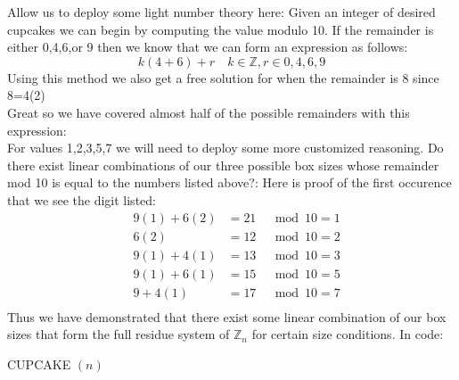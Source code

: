 \documentclass[11pt]{article}
\theoremstyle{definition}  %
\newcommand{\Z}{\mathbb{Z}}
\begin{document}
Allow us to deploy some light number theory here: Given an integer of desired cupcakes we can begin by computing the value modulo 10. If the remainder is either 0,4,6,or 9 then we know that we can form an expression as follows:
\[
  k(4+6)+r\quad k \in \Z , r\in {0,4,6,9}
\]
Using this method we also get a free solution for when the remainder is 8 since 8=4(2)\\
Great so we have covered almost half of the possible remainders with this expression: \\
For values 1,2,3,5,7 we will need to deploy some more customized reasoning. Do there exist linear combinations of our three possible box sizes whose remainder mod 10 is equal to the numbers listed above?: Here is proof of the first occurence that we see the digit listed:
\begin{align*}
  &9(1)+6(2)&=21 &\mod 10=1 \\
  &6(2)&=12 &\mod 10=2 \\
  &9(1)+4(1)&=13 &\mod 10=3 \\
  &9(1)+6(1)&=15 &\mod 10=5 \\
  &9+4(1)&=17&\mod 10=7 \\
\end{align*}
Thus we have demonstrated that there exist some linear combination of our box sizes that form the full residue system of $\Z_n$ for certain size conditions.
In code:
\begin{algorithm}
    \caption{CUPCAKE $(n)$ }
    \label{alg:algorithm_sum}
    \begin{algorithmic}[1]





      \Else


      \EndIf
    \end{algorithmic}
  \end{algorithm}\\\\
  \pagebreak
  \pagebreak
\end{document}
